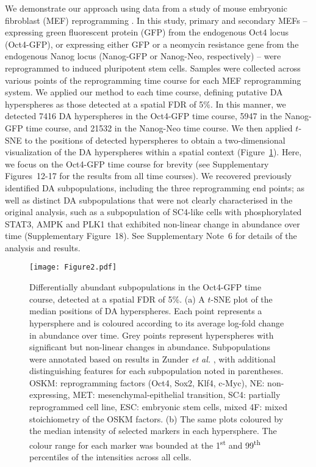 \documentclass{article}
\newcommand{\suppsecmef}{6}
\newcommand{\suppfigrealextra}{12-17}
\newcommand{\suppfignonlinear}{18}
\begin{document}
We demonstrate our approach using data from a study of mouse embryonic fibroblast (MEF) reprogramming \cite{zunder2015continuous}.
In this study, primary and secondary MEFs 
-- expressing green fluorescent protein (GFP) from the endogenous Oct4 locus (Oct4-GFP),
or expressing either GFP or a neomycin resistance gene from the endogenous Nanog locus (Nanog-GFP or Nanog-Neo, respectively) -- 
were reprogrammed to induced pluripotent stem cells.
Samples were collected across various points of the reprogramming time course for each MEF reprogramming system.
We applied our method to each time course, defining putative DA hyperspheres as those detected at a spatial FDR of 5\%.
In this manner, we detected 7416 DA hyperspheres in the Oct4-GFP time course, 5947 in the Nanog-GFP time course, and 21532 in the Nanog-Neo time course.
We then applied $t$-SNE \cite{van2008visualizing} to the positions of detected hyperspheres to obtain a two-dimensional visualization of the DA hyperspheres within a spatial context (Figure~\ref{fig:oct4}).
Here, we focus on the Oct4-GFP time course for brevity (see Supplementary Figures~\suppfigrealextra{} for the results from all time courses).
We recovered previously identified DA subpopulations, including the three reprogramming end points; as well as distinct DA subpopulations that were not clearly characterised in the original analysis, such as a subpopulation of SC4-like cells with phosphorylated STAT3, AMPK and PLK1 that exhibited non-linear change in abundance over time (Supplementary Figure~\suppfignonlinear{}).
See Supplementary Note~\suppsecmef{} for details of the analysis and results.

\begin{figure}[p]
    \begin{center}
    \texttt{[image: Figure2.pdf]}
\end{center}
    \caption{
        Differentially abundant subpopulations in the Oct4-GFP time course, detected at a spatial FDR of 5\%.
        (a) A $t$-SNE plot of the median positions of DA hyperspheres. 
        Each point represents a hypersphere and is coloured according to its average log-fold change in abundance over time.
        Grey points represent hyperspheres with significant but non-linear changes in abundance.
        Subpopulations were annotated based on results in Zunder \emph{et al.} \cite{zunder2015continuous}, with additional distinguishing features for each subpopulation noted in parentheses.
        OSKM: reprogramming factors (Oct4, Sox2, Klf4, c-Myc), NE: non-expressing, MET: mesenchymal-epithelial transition, SC4: partially reprogrammed cell line, ESC: embryonic stem cells, mixed 4F: mixed stoichiometry of the OSKM factors.
        (b) The same plots coloured by the median intensity of selected markers in each hypersphere.
        The colour range for each marker was bounded at the 1\textsuperscript{st} and 99\textsuperscript{th} percentiles of the intensities across all cells.
    }
    \label{fig:oct4}
\end{figure}
\end{document}
